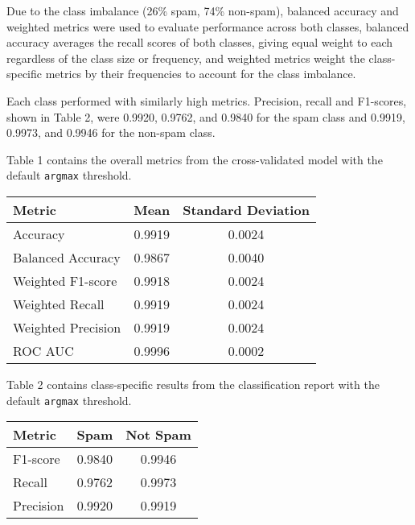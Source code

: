 \documentclass{article}      %
\begin{document}
Due to the class imbalance (26\% spam, 74\% non-spam), balanced accuracy and weighted metrics were used to evaluate performance across both classes, balanced accuracy averages the recall scores of both classes, giving equal weight to each regardless of the class size or frequency, and weighted metrics weight the class-specific metrics by their frequencies to account for the class imbalance.

Each class performed with similarly high metrics. Precision, recall and F1-scores, shown in Table 2, were 0.9920, 0.9762, and 0.9840 for the spam class and 0.9919, 0.9973, and 0.9946 for the non-spam class.

\FloatBarrier
Table 1 contains the overall metrics from the cross-validated model with the default \texttt{argmax} threshold.

\begin{table}[!h]
    \centering
    \begin{tabular}{|l|c|c|}
    \hline
    \textbf{Metric} & \textbf{Mean} & \textbf{Standard Deviation} \\ \hline
    Accuracy & 0.9919 & 0.0024 \\ \hline
    Balanced Accuracy & 0.9867 & 0.0040 \\ \hline
    Weighted F1-score & 0.9918 & 0.0024 \\ \hline
    Weighted Recall & 0.9919 & 0.0024 \\ \hline
    Weighted Precision & 0.9919 & 0.0024 \\ \hline
    ROC AUC & 0.9996 & 0.0002 \\ \hline
    \end{tabular}
    \label{table:overall_metrics}
\end{table}

\FloatBarrier
Table 2 contains class-specific results from the classification report with the default \texttt{argmax} threshold.

\begin{table}[!h]
    \centering
    \begin{tabular}{|l|c|c|}
    \hline
    \textbf{Metric} & \textbf{Spam} & \textbf{Not Spam} \\ \hline
    F1-score & 0.9840 & 0.9946 \\ \hline
    Recall & 0.9762 & 0.9973 \\ \hline
    Precision & 0.9920 & 0.9919 \\ \hline
    \end{tabular}
    \label{table:class_metrics}
\end{table}
\end{document}

